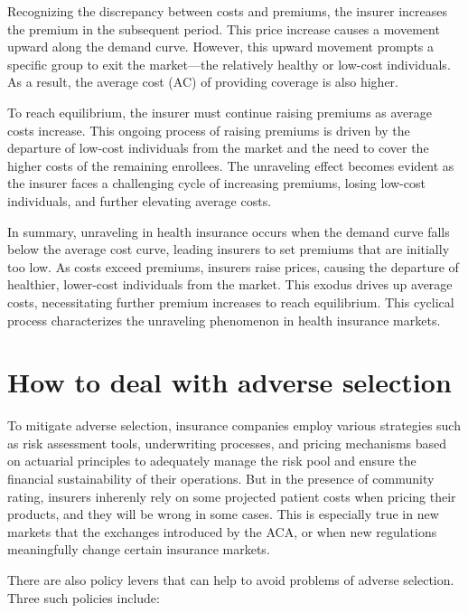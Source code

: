 \documentclass[
  letterpaper,
  DIV=11,
  numbers=noendperiod]{scrreport}
\theoremstyle{definition}
\theoremstyle{remark}
\begin{document}
Recognizing the discrepancy between costs and premiums, the insurer
increases the premium in the subsequent period. This price increase
causes a movement upward along the demand curve. However, this upward
movement prompts a specific group to exit the market---the relatively
healthy or low-cost individuals. As a result, the average cost (AC) of
providing coverage is also higher.

To reach equilibrium, the insurer must continue raising premiums as
average costs increase. This ongoing process of raising premiums is
driven by the departure of low-cost individuals from the market and the
need to cover the higher costs of the remaining enrollees. The
unraveling effect becomes evident as the insurer faces a challenging
cycle of increasing premiums, losing low-cost individuals, and further
elevating average costs.

In summary, unraveling in health insurance occurs when the demand curve
falls below the average cost curve, leading insurers to set premiums
that are initially too low. As costs exceed premiums, insurers raise
prices, causing the departure of healthier, lower-cost individuals from
the market. This exodus drives up average costs, necessitating further
premium increases to reach equilibrium. This cyclical process
characterizes the unraveling phenomenon in health insurance markets.

\hypertarget{how-to-deal-with-adverse-selection}{%
\section{How to deal with adverse
selection}\label{how-to-deal-with-adverse-selection}}

To mitigate adverse selection, insurance companies employ various
strategies such as risk assessment tools, underwriting processes, and
pricing mechanisms based on actuarial principles to adequately manage
the risk pool and ensure the financial sustainability of their
operations. But in the presence of community rating, insurers inherenly
rely on some projected patient costs when pricing their products, and
they will be wrong in some cases. This is especially true in new markets
that the exchanges introduced by the ACA, or when new regulations
meaningfully change certain insurance markets.

There are also policy levers that can help to avoid problems of adverse
selection. Three such policies include:
\end{document}
